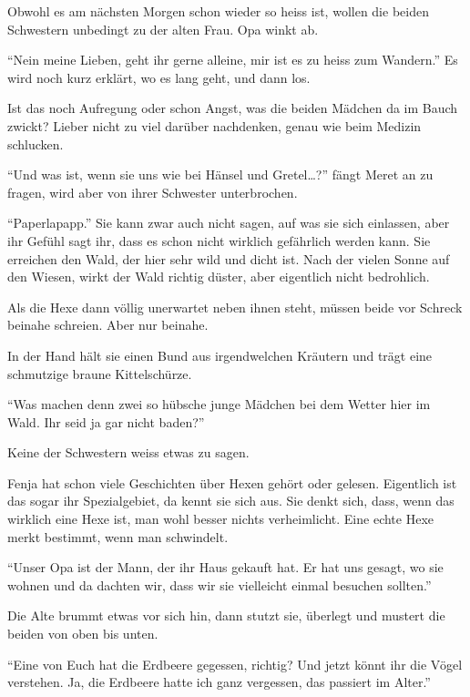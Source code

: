 \begin{center}
    {\color{DeepPink}\aldineleft}
\end{center}

Obwohl es am nächsten Morgen schon wieder so heiss ist, wollen die beiden Schwestern unbedingt zu der alten Frau. Opa winkt ab.

\enquote{Nein meine Lieben, geht ihr gerne alleine, mir ist es zu heiss zum Wandern.} Es wird noch kurz erklärt, wo es lang geht, und dann los.

Ist das noch Aufregung oder schon Angst, was die beiden Mädchen da im Bauch
zwickt? Lieber nicht zu viel darüber nachdenken, genau wie beim Medizin schlucken. 

\enquote{Und was ist, wenn sie uns wie bei Hänsel und Gretel\dots?} fängt Meret an zu fragen, wird aber von ihrer Schwester unterbrochen.

\enquote{Paperlapapp.} Sie kann zwar auch nicht sagen, auf was sie sich einlassen, aber ihr Gefühl sagt ihr, dass es schon nicht wirklich gefährlich werden kann. Sie erreichen den Wald, der hier sehr wild und dicht ist. Nach der vielen Sonne auf den Wiesen, wirkt der Wald richtig düster, aber eigentlich nicht bedrohlich.

Als die Hexe dann völlig unerwartet neben ihnen steht, müssen beide vor Schreck beinahe schreien. Aber nur beinahe. 

In der Hand hält sie einen Bund aus irgendwelchen Kräutern und trägt eine schmutzige braune Kittelschürze.

\enquote{Was machen denn zwei so hübsche junge Mädchen bei dem Wetter hier im Wald. Ihr seid ja gar nicht baden?}

Keine der Schwestern weiss etwas zu sagen.

Fenja hat schon viele Geschichten über Hexen gehört oder gelesen. Eigentlich
ist das sogar ihr Spezialgebiet, da kennt sie sich aus. Sie denkt sich, dass, wenn das wirklich eine Hexe ist, man wohl besser nichts verheimlicht. Eine echte Hexe merkt bestimmt, wenn man schwindelt.

\enquote{Unser Opa ist der Mann, der ihr Haus gekauft hat. Er hat uns gesagt, wo sie wohnen und da dachten wir, dass wir sie vielleicht einmal besuchen sollten.}

Die Alte brummt etwas vor sich hin, dann stutzt sie, überlegt und mustert die beiden von oben bis unten.

\enquote{Eine von Euch hat die Erdbeere gegessen, richtig? Und jetzt könnt ihr die Vögel verstehen. Ja, die Erdbeere hatte ich ganz vergessen, das passiert im Alter.}

